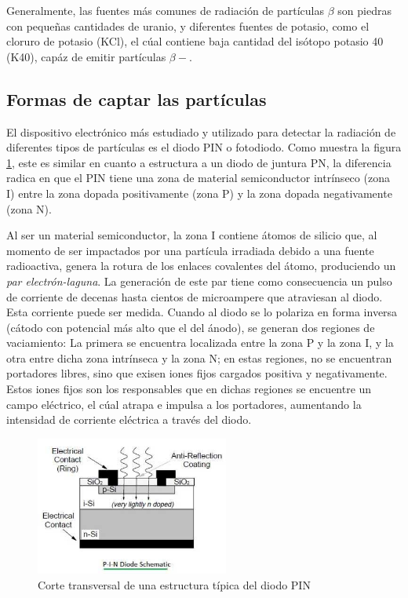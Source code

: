\documentclass[a4paper,conference]{IEEEtran}
\begin{document}
        Generalmente, las fuentes más comunes de radiación de partículas $\beta$
        son piedras con pequeñas cantidades de uranio, y diferentes fuentes de
        potasio, como el cloruro de potasio (KCl), el cúal contiene baja
        cantidad del isótopo potasio 40 (K40), capáz de emitir partículas
        $\beta-$.

    \subsection{Formas de captar las partículas}
       El dispositivo electrónico más estudiado y utilizado para detectar la
       radiación de diferentes tipos de partículas es el diodo PIN o fotodiodo.
       Como muestra la figura \ref{fig:pin}, este es similar en cuanto a
       estructura a un diodo de juntura PN, la diferencia radica en que el PIN
       tiene una zona de material semiconductor intrínseco (zona I) entre la
       zona dopada positivamente (zona P) y la zona dopada negativamente (zona
       N).\par Al ser un material semiconductor, la zona I contiene átomos de
       silicio que, al momento de ser impactados por una partícula irradiada
       debido a una fuente radioactiva, genera la rotura de los enlaces
       covalentes del átomo, produciendo un \emph{par electrón-laguna}. La
       generación de este par tiene como consecuencia un pulso de corriente de
       decenas hasta cientos de microampere que atraviesan al diodo. Esta
       corriente puede ser medida. Cuando al diodo se lo polariza en
       forma inversa (cátodo con potencial más alto que el del ánodo),
       se generan dos regiones de vaciamiento: La primera se encuentra
       localizada entre la zona P y la zona I, y la otra entre dicha zona
       intrínseca y la zona N; en estas regiones, no se encuentran portadores
       libres, sino que exisen iones fijos cargados positiva y negativamente.
       Estos iones fijos son los responsables que en dichas regiones se encuentre
       un campo eléctrico, el cúal atrapa e impulsa a los portadores, aumentando
       la intensidad de corriente eléctrica a través del diodo.
       \newpage
       \begin{figure}[!t]
           \centering
           \includegraphics[width=2.5inch]{img/PIN_structure.jpg}
           \caption{Corte transversal de una estructura típica del diodo PIN}
           \label{fig:pin}
       \end{figure}
\end{document}
